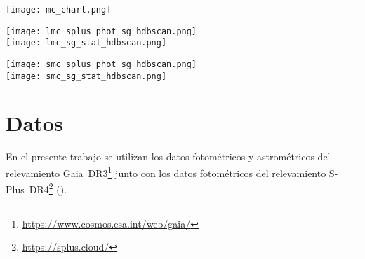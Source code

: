 \documentclass[baaa]{baaa}
\begin{document}
\begin{figure*}[!t]
\centering
\texttt{[image: mc\_chart.png]}
\caption{Imagen basada en el relevamiento DSS2 de Aladin cubriendo la región de las dos MCs. Los 150 campos del relevamiento S-Plus ($1.4^{\circ} \times 1.4^{\circ}$) se hallan indicados por los cuadrados azules. Los círculos verdes indican las regiones centradas en cada una de las galaxias y adoptadas para la selección de los datos Gaia.}
\label{fig:MCchart}
\end{figure*}

\begin{figure*}[!t]
\centering
\texttt{[image: lmc\_splus\_phot\_sg\_hdbscan.png]} \\
\texttt{[image: lmc\_sg\_stat\_hdbscan.png]}
\caption{Diagramas de las agrupaciones estelares identificadas en la Nube Mayor de Magallanes. Los paneles de la primer fila presentan las cartas buscadoras de las estrellas consideradas miembros de las agrupaciones estelares. Los paneles de la segunda, tercer y cuarta filas corresponden a los diagramas fotométricos. Los paneles de las últimas tres filas indican la cantidad de agrupaciones, sus distribuciones de tamaños y de sobredensidades. Cada columna corresponde a una clasificación diferente. Se presentan también los tamaños medios ($r_m$) y sobredensidades medias ($\Delta \rho_m$) de cada caso.}
\label{fig:LMCsg}
\end{figure*}

\begin{figure*}[!t]
\centering
\texttt{[image: smc\_splus\_phot\_sg\_hdbscan.png]} \\
\texttt{[image: smc\_sg\_stat\_hdbscan.png]}
\caption{Diagramas de las agrupaciones estelares identificadas en la Nube Menor de Magallanes. El significado de los paneles es análogo a los de la Fig.~\ref{fig:LMCsg}.}
\label{fig:SMCsg}
\end{figure*}

\section{Datos}

En el presente trabajo se utilizan los datos fotométricos y astrométricos del relevamiento Gaia~DR3\footnote{\url{https://www.cosmos.esa.int/web/gaia/}} \citep{GaiaDR3_2023} junto con los datos fotométricos del relevamiento S-Plus~DR4\footnote{\url{https://splus.cloud/}} (\citealt{SPlus_2019, Herpich2024}). 
\end{document}
